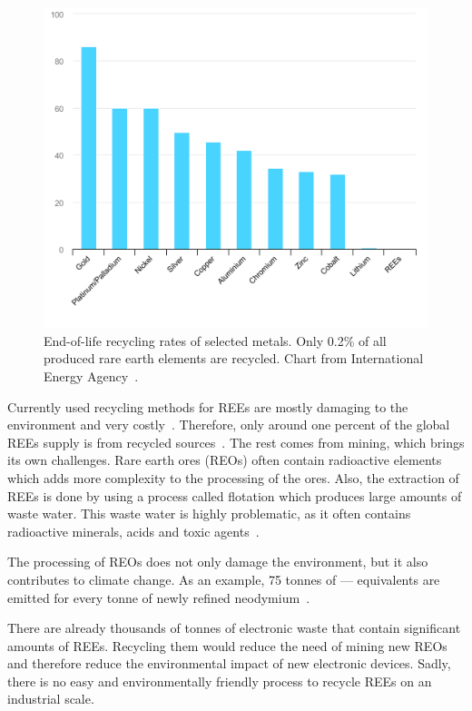 \begin{figure}[H]
    \centering
    \includegraphics[width=1\textwidth]{./media/images/end-of-life-recycling-rates-for-selected-metals}
    \caption{End-of-life recycling rates of selected metals. Only 0.2\% of all produced rare earth elements are recycled. Chart from International Energy Agency~\cite{reeclimate}.}
    \label{fig:recycling_rates}
\end{figure}

Currently used recycling methods for REEs are mostly damaging to the environment and very costly~\cite{recyclingcurrent}.
Therefore, only around one percent of the global REEs supply is from recycled sources~\cite{currentrecyclingnumbers}.
The rest comes from mining, which brings its own challenges.
Rare earth ores (REOs) often contain radioactive elements which adds more complexity to the processing of the ores.
Also, the extraction of REEs is done by using a process called flotation which produces large amounts of waste water.
This waste water is highly problematic, as it often contains radioactive minerals, acids and toxic agents~\cite{reeenvimpact}.

The processing of REOs does not only damage the environment, but it also contributes to climate change.
As an example, 75 tonnes of — equivalents are emitted for every tonne of newly refined neodymium~\cite{reeclimate}.

There are already thousands of tonnes of electronic waste that contain significant amounts of REEs. Recycling them would reduce the need of mining new REOs and therefore reduce the environmental impact of new electronic devices.
Sadly, there is no easy and environmentally friendly process to recycle REEs on an industrial scale.



